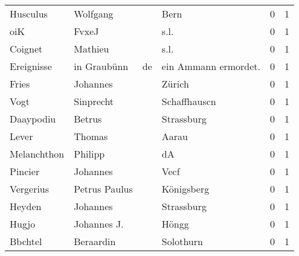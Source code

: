 \documentclass[10pt,a4paper,landscape]{article}
\begin{document}
\begin{longtable}{llllrr}
                 Husculus &                           Wolfgang &             &                                        Bern &          0 &         1 \\
                      oiK &                              FvxeJ &             &                                        s.l. &          0 &         1 \\
                  Coignet &                            Mathieu &             &                                        s.l. &          0 &         1 \\
               Ereignisse &                        in Graubünn &          de &                       ein Ammann ermordet.  &          0 &         1 \\
                    Fries &                           Johannes &             &                                      Zürich &          0 &         1 \\
                     Vogt &                          Sinprecht &             &                                Schaffhauscn &          0 &         1 \\
                Daaypodiu &                             Betrus &             &                                  Strassburg &          0 &         1 \\
                    Lever &                             Thomas &             &                                       Aarau &          0 &         1 \\
              Melanchthon &                            Philipp &             &                                          dA &          0 &         1 \\
                  Pincier &                           Johannes &             &                                        Vecf &          0 &         1 \\
                Vergerius &                      Petrus Paulus &             &                                  Königsberg &          0 &         1 \\
                   Heyden &                           Johannes &             &                                  Strassburg &          0 &         1 \\
                    Hugjo &                        Johannes J. &             &                                       Höngg &          0 &         1 \\
                  Bbchtel &                          Beraardin &             &                                   Solothurn &          0 &         1 \\

\end{longtable}
\end{document}

